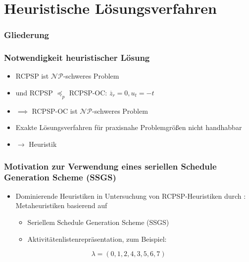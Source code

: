 
\section{Heuristische Lösungsverfahren}

\begin{frame}
\frametitle{Gliederung}
\tableofcontents[current] %
\end{frame}

\begin{frame}
\frametitle{Notwendigkeit heuristischer Lösung}
\begin{itemize}
\item RCPSP ist $\mathcal{NP}$-schweres Problem
\item und RCPSP $\preceq_p$ RCPSP-OC: $\overline{z}_{r}=0, u_t=-t$
\item[] $\implies$ RCPSP-OC ist $\mathcal{NP}$-schweres Problem\\[10mm]
\item Exakte Lösungsverfahren für praxisnahe Problemgrößen nicht handhabbar
\item[] $\rightarrow$ Heuristik
\end{itemize}
\end{frame}

\begin{frame}
\frametitle{Motivation zur Verwendung eines seriellen Schedule Generation Scheme (SSGS)}
\begin{itemize}
\item Dominierende Heuristiken in Untersuchung von RCPSP-Heuristiken durch {\footnotesize \cite{Kolisch2006}}:\\[6mm] Metaheuristiken basierend auf
\begin{itemize}
\item Seriellem Schedule Generation Scheme (SSGS)
\item Aktivitätenlistenrepräsentation, zum Beispiel:
\end{itemize}
\end{itemize}
\[\lambda=(0,1,2,4,3,5,6,7)\]
\end{frame}

